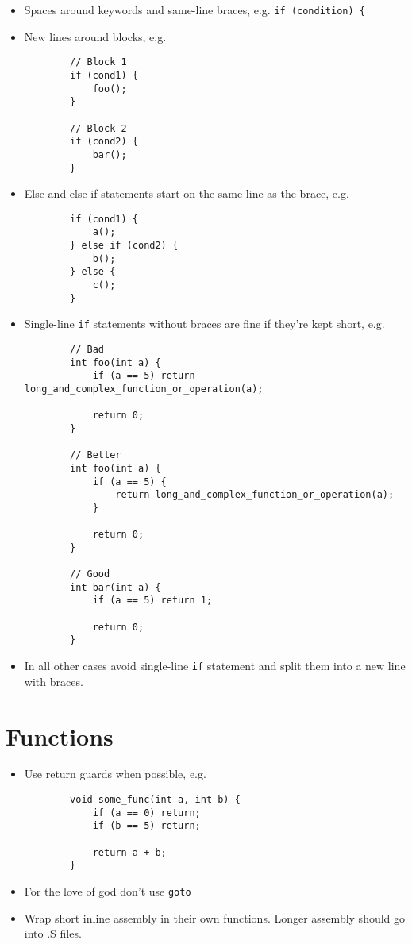 \documentclass{article}
\begin{document}
\begin{itemize}
	\item Spaces around keywords and same-line braces, e.g. \lstinline{if (condition) { }
	\item New lines around blocks, e.g.
	\begin{lstlisting}
		// Block 1
		if (cond1) {
			foo();
		}

		// Block 2
		if (cond2) {
			bar();
		}
	\end{lstlisting}

	\item Else and else if statements start on the same line as the brace, e.g.
	\begin{lstlisting}
		if (cond1) {
			a();
		} else if (cond2) {
			b();
		} else {
			c();
		}
	\end{lstlisting}

	\item Single-line \lstinline{if} statements without braces are fine if they're kept short, e.g.
	
	\begin{lstlisting}
		// Bad
		int foo(int a) {
			if (a == 5) return long_and_complex_function_or_operation(a);

			return 0;
		}

		// Better
		int foo(int a) {
			if (a == 5) {
				return long_and_complex_function_or_operation(a);
			}

			return 0;
		}

		// Good
		int bar(int a) {
			if (a == 5) return 1;

			return 0;
		}
	\end{lstlisting}

	\item In all other cases avoid single-line \lstinline{if} statement and split them into a new line with braces.
\end{itemize}

\section{Functions}
\begin{itemize}
	\item Use return guards when possible, e.g.
	\begin{lstlisting}
		void some_func(int a, int b) {
			if (a == 0) return;
			if (b == 5) return;

			return a + b;
		}
	\end{lstlisting}

	\item For the love of god don't use \lstinline{goto}
	\item Wrap short inline assembly in their own functions. Longer assembly should go into .S files.
\end{itemize}
\end{document}
